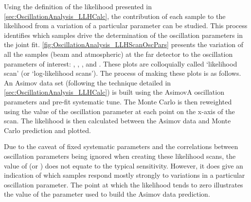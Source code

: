 Using the definition of the likelihood presented in \autoref{sec:OscillationAnalysis_LLHCalc}, the contribution of each sample to the likelihood from a variation of a particular parameter can be studied. This process identifies which samples drive the determination of the oscillation parameters in the joint fit.
\autoref{fig:OscillationAnalysis_LLHScanOscPars} presents the variation of all the samples (beam and atmospheric) at the far detector to the oscillation parameters of interest: , , , and . These plots are colloquially called `likelihood scan' (or `log-likelihood scans'). The process of making these plots is as follows. An Asimov data set (following the technique detailed in \autoref{sec:OscillationAnalysis_LLHCalc}) is built using the AsimovA oscillation parameters and pre-fit systematic tune. The Monte Carlo is then reweighted using the value of the oscillation parameter at each point on the x-axis of the scan. The likelihood is then calculated between the Asimov data and Monte Carlo prediction and plotted. 

Due to the caveat of fixed systematic parameters and the correlations between oscillation parameters being ignored when creating these likelihood scans, the value of  (or ) does not equate to the typical \quickmath{1\sigma} sensitivity. However, it does give an indication of which samples respond mostly strongly to variations in a particular oscillation parameter. The point at which the likelihood tends to zero illustrates the value of the parameter used to build the Asimov data prediction.

